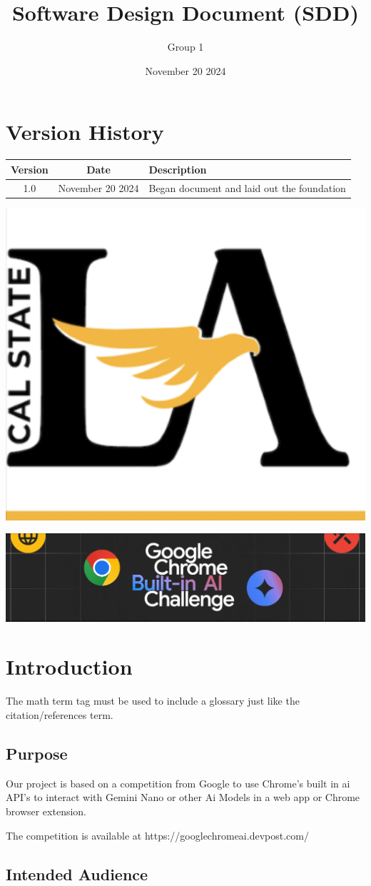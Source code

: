 \documentclass{article}
\title{Software Design Document (SDD)}
\author{Group 1 }
\date{November 20 2024}
\begin{document}
\maketitle  
\pagebreak

\tableofcontents
\pagebreak

\section*{Version History}
\begin{longtable}{|c|c|p{10cm}|}
\hline
\textbf{Version} & \textbf{Date} & \textbf{Description} \\ \hline
1.0 & November 20 2024 & Began document and laid out the foundation \\ \hline
\end{longtable}
\pagebreak

\includegraphics[width=0.3\linewidth]{../logo/csula.png} 

\includegraphics[width=0.3\linewidth]{../logo/chromeai.png} 
\section{Introduction}
The \Gls{math} term tag must be used to include a glossary just like the citation/references \gls{term}. 
\subsection{Purpose}
Our project is based on a competition from Google to use Chrome's built in \Gls{ai} API's to interact with Gemini Nano or other Ai Models in a web app or Chrome browser extension. 

The competition is available at https://googlechromeai.devpost.com/

\subsection{Intended Audience}
\lipsum[2]
\end{document}
